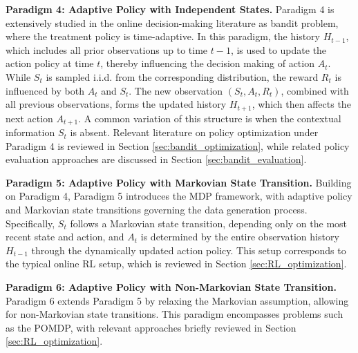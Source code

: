 \textbf{Paradigm 4: Adaptive Policy with Independent States.}
Paradigm 4 is extensively studied in the online decision-making literature as bandit problem, where the treatment policy is time-adaptive. In this paradigm, the history $H_{t-1}$, which includes all prior observations up to time $t-1$, is used to update the action policy at time $t$, thereby influencing the decision making of action $A_t$. While $S_t$ is sampled i.i.d. from the corresponding distribution, the reward $R_t$ is influenced by both $A_t$ and $S_t$. The new observation $(S_t,A_t,R_t)$, combined with all previous observations, forms the updated history $H_{t+1}$, which then affects the next action $A_{t+1}$. A common variation of this structure is when the contextual information $S_t$ is absent. Relevant literature on policy optimization under Paradigm 4 is reviewed in Section \ref{sec:bandit_optimization}, while related policy evaluation approaches are discussed in Section \ref{sec:bandit_evaluation}.


\textbf{Paradigm 5: Adaptive Policy with Markovian State Transition.}
Building on Paradigm 4, Paradigm 5 introduces the \acrshort{MDP} framework, with adaptive policy and Markovian state transitions governing the data generation process. Specifically, $S_t$ follows a Markovian state transition, depending only on the most recent state and action, and $A_t$ is determined by the entire observation history $H_{t-1}$ through the dynamically updated action policy. This setup corresponds to the typical online \acrshort{RL} setup, which is reviewed in Section \ref{sec:RL_optimization}.


\textbf{Paradigm 6: Adaptive Policy with Non-Markovian State Transition.}
Paradigm 6 extends Paradigm 5 by relaxing the Markovian assumption, allowing for non-Markovian state transitions. This paradigm encompasses problems such as the \acrfull{POMDP}, with relevant approaches briefly reviewed in Section \ref{sec:RL_optimization}.



